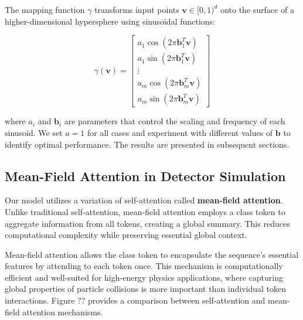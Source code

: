 The mapping function \( \gamma \) transforms input points \( \mathbf{v} \in [0, 1)^d \) onto the surface of a higher-dimensional hypersphere using sinusoidal functions:

\begin{equation}
\gamma(\mathbf{v}) = 
\begin{bmatrix}
a_1 \cos(2 \pi \mathbf{b}_1^T \mathbf{v}) \\ 
a_1 \sin(2 \pi \mathbf{b}_1^T \mathbf{v}) \\ 
\vdots \\ 
a_m \cos(2 \pi \mathbf{b}_m^T \mathbf{v}) \\ 
a_m \sin(2 \pi \mathbf{b}_m^T \mathbf{v})
\end{bmatrix}
\end{equation}

where \( a_i \) and \( \mathbf{b}_i \) are parameters that control the scaling and frequency of each sinusoid. We set \( a = 1 \) for all cases and experiment with different values of \( \mathbf{b} \) to identify optimal performance. The results are presented in subsequent sections.

\subsection{Mean-Field Attention in Detector Simulation}
Our model utilizes a variation of self-attention called \textbf{mean-field attention}. Unlike traditional self-attention, mean-field attention employs a class token to aggregate information from all tokens, creating a global summary. This reduces computational complexity while preserving essential global context.

Mean-field attention allows the class token to encapsulate the sequence's essential features by attending to each token once. This mechanism is computationally efficient and well-suited for high-energy physics applications, where capturing global properties of particle collisions is more important than individual token interactions. Figure ?? provides a comparison between self-attention and mean-field attention mechanisms.

